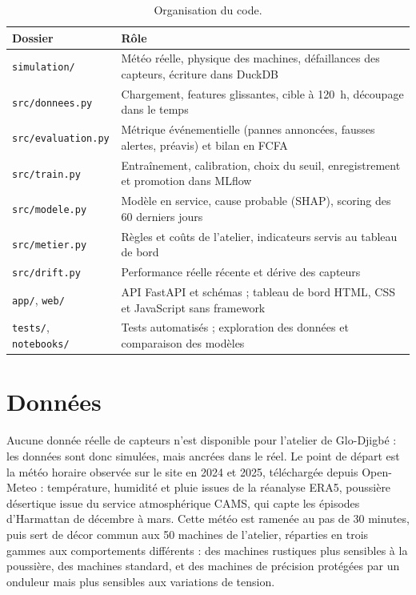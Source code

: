 \documentclass[11pt,a4paper]{article}
\newcommand{\entete}{}
\newcommand{\var}[1]{\texttt{#1}}
\begin{document}
\begin{table}[H]
\centering\small
\begin{tabular}{@{}L{3.6cm}L{12cm}@{}}
\toprule
\entete \textbf{Dossier} & \textbf{Rôle} \\
\midrule
\var{simulation/} & Météo réelle, physique des machines, défaillances des capteurs, écriture dans DuckDB \\
\var{src/donnees.py} & Chargement, features glissantes, cible à 120~h, découpage dans le temps \\
\var{src/evaluation.py} & Métrique événementielle (pannes annoncées, fausses alertes, préavis) et bilan en FCFA \\
\var{src/train.py} & Entraînement, calibration, choix du seuil, enregistrement et promotion dans MLflow \\
\var{src/modele.py} & Modèle en service, cause probable (SHAP), scoring des 60 derniers jours \\
\var{src/metier.py} & Règles et coûts de l'atelier, indicateurs servis au tableau de bord \\
\var{src/drift.py} & Performance réelle récente et dérive des capteurs \\
\var{app/}, \var{web/} & API FastAPI et schémas ; tableau de bord HTML, CSS et JavaScript sans framework \\
\var{tests/}, \var{notebooks/} & Tests automatisés ; exploration des données et comparaison des modèles \\
\bottomrule
\end{tabular}
\caption{Organisation du code.}
\end{table}

\section{Données}

Aucune donnée réelle de capteurs n'est disponible pour l'atelier de Glo-Djigbé : les données sont donc simulées, mais
ancrées dans le réel. Le point de départ est la météo horaire observée sur le site en 2024 et 2025, téléchargée depuis
Open-Meteo : température, humidité et pluie issues de la réanalyse ERA5, poussière désertique issue du service
atmosphérique CAMS, qui capte les épisodes d'Harmattan de décembre à mars. Cette météo est ramenée au pas de 30 minutes,
puis sert de décor commun aux 50 machines de l'atelier, réparties en trois gammes aux comportements différents : des
machines rustiques plus sensibles à la poussière, des machines standard, et des machines de précision protégées par
un onduleur mais plus sensibles aux variations de tension.
\end{document}
